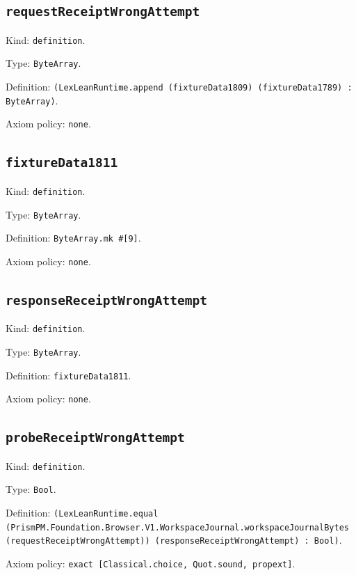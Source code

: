 \documentclass[11pt]{article}
\begin{document}
\subsection*{\texttt{requestReceiptWrongAttempt}}
\noindent Kind: \texttt{definition}.\par
\noindent Type: \texttt{ByteArray}.\par
\noindent Definition: \texttt{(LexLeanRuntime.append (fixtureData1809) (fixtureData1789) : ByteArray)}.\par
\noindent Axiom policy: \texttt{none}.\par
\subsection*{\texttt{fixtureData1811}}
\noindent Kind: \texttt{definition}.\par
\noindent Type: \texttt{ByteArray}.\par
\noindent Definition: \texttt{ByteArray.mk \#[9]}.\par
\noindent Axiom policy: \texttt{none}.\par
\subsection*{\texttt{responseReceiptWrongAttempt}}
\noindent Kind: \texttt{definition}.\par
\noindent Type: \texttt{ByteArray}.\par
\noindent Definition: \texttt{fixtureData1811}.\par
\noindent Axiom policy: \texttt{none}.\par
\subsection*{\texttt{probeReceiptWrongAttempt}}
\noindent Kind: \texttt{definition}.\par
\noindent Type: \texttt{Bool}.\par
\noindent Definition: \texttt{(LexLeanRuntime.equal (PrismPM.Foundation.Browser.V1.WorkspaceJournal.workspaceJournalBytes (requestReceiptWrongAttempt)) (responseReceiptWrongAttempt) : Bool)}.\par
\noindent Axiom policy: \texttt{exact [Classical.choice, Quot.sound, propext]}.\par
\end{document}
